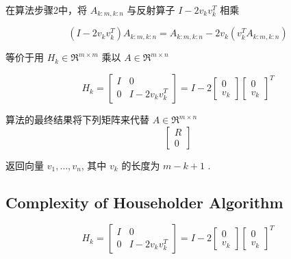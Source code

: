 \begin{theorem}
     在算法步骤2中，将 $ A_{k: m, k: n} $ 与反射算子 $ I-2 v_{k} v_{k}^{T} $ 相乘

    \begin{equation} \left(I-2 v_{k} v_{k}^{T}\right) A_{k: m, k: n}=A_{k: m, k: n}-2 v_{k}\left(v_{k}^{T} A_{k: m, k: n}\right) \end{equation}

    等价于用 $ H_{k} \in \mathfrak{R}^{m \times m} $ 乘以 $ A \in \mathfrak{R}^{m \times n}  $

    \begin{equation} H_{k}=\left[\begin{array}{cc}I & 0 \\ 0 & I-2 v_{k} v_{k}^{T}\end{array}\right]=I-2\left[\begin{array}{c}0 \\ v_{k}\end{array}\right]\left[\begin{array}{l}0 \\ v_{k}\end{array}\right]^{T} \end{equation}
\end{theorem}

   

算法的最终结果将下列矩阵来代替 $ A\in \mathfrak{R}^{m \times n}  $
\begin{equation}
\left[\begin{array}{c}
R \\
0
\end{array}\right]
\end{equation}

返回向量 $ v_{1}, \ldots, v_{n} $, 其中 $ v_{k} $ 的长度为 $ m-k+1 $ .

\subsection{Complexity of Householder Algorithm}
\label{complexity:householder}

\begin{equation} H_{k}=\left[\begin{array}{cc}I & 0 \\ 0 & I-2 v_{k} v_{k}^{T}\end{array}\right]=I-2\left[\begin{array}{c}0 \\ v_{k}\end{array}\right]\left[\begin{array}{l}0 \\ v_{k}\end{array}\right]^{T} \end{equation}

